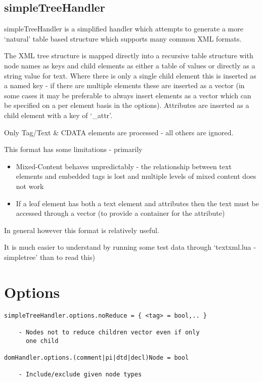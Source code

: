 \documentclass{ltxdoc}
\begin{document}
\subsection{simpleTreeHandler}

simpleTreeHandler is a simplified handler which attempts to generate a
more `natural' table based structure which supports many common XML
formats.

The XML tree structure is mapped directly into a recursive table
structure with node names as keys and child elements as either a table
of values or directly as a string value for text. Where there is only a
single child element this is inserted as a named key - if there are
multiple elements these are inserted as a vector (in some cases it may
be preferable to always insert elements as a vector which can be
specified on a per element basis in the options). Attributes are
inserted as a child element with a key of `\_attr'.

Only Tag/Text \& CDATA elements are processed - all others are ignored.

This format has some limitations - primarily

\begin{itemize}
\item
  Mixed-Content behaves unpredictably - the relationship between text
  elements and embedded tags is lost and multiple levels of mixed
  content does not work
\item
  If a leaf element has both a text element and attributes then the text
  must be accessed through a vector (to provide a container for the
  attribute)
\end{itemize}
In general however this format is relatively useful.

It is much easier to understand by running some test data through
`textxml.lua -simpletree' than to read this)

\section{Options}

\begin{verbatim}
simpleTreeHandler.options.noReduce = { <tag> = bool,.. }

    - Nodes not to reduce children vector even if only 
      one child

domHandler.options.(comment|pi|dtd|decl)Node = bool 

    - Include/exclude given node types
\end{verbatim}
\end{document}
